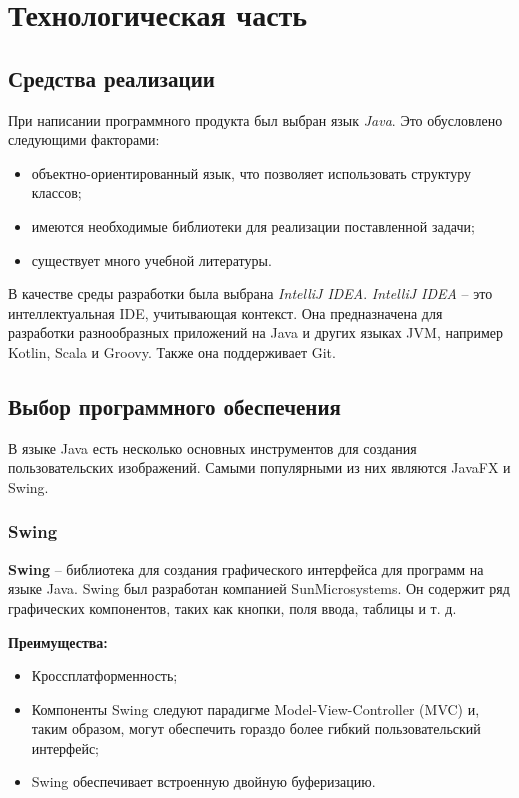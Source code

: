 \chapter{Технологическая часть}

\section{Средства реализации}

При написании программного продукта был выбран язык \textit{Java}. Это обусловлено следующими факторами:

\begin{itemize}
	\item объектно-ориентированный язык, что позволяет использовать структуру классов;
	\item имеются необходимые библиотеки для реализации поставленной задачи;
	\item существует много учебной литературы.
\end{itemize}

В качестве среды разработки была выбрана \textit{IntelliJ IDEA}. \textit{IntelliJ IDEA} -- это интеллектуальная IDE, учитывающая контекст. Она предназначена для разработки разнообразных приложений на Java и других языках JVM, например Kotlin, Scala и Groovy. Также она поддерживает Git.

\section{Выбор программного обеспечения}

В языке Java есть несколько основных инструментов для создания пользовательских изображений. Самыми популярными из них являются JavaFX и Swing.

\subsection{Swing}

\textbf{Swing} -- библиотека для создания графического интерфейса для программ на языке Java. Swing был разработан компанией SunMicrosystems. Он содержит ряд графических компонентов, таких как кнопки, поля ввода, таблицы и т. д.

\textbf{Преимущества:} 
\begin{itemize}
	\item Кроссплатформенность;
	\item Компоненты Swing следуют парадигме Model-View-Controller (MVC) и, таким образом, могут обеспечить гораздо более гибкий пользовательский интерфейс;
	\item Swing обеспечивает встроенную двойную буферизацию.
\end{itemize}

